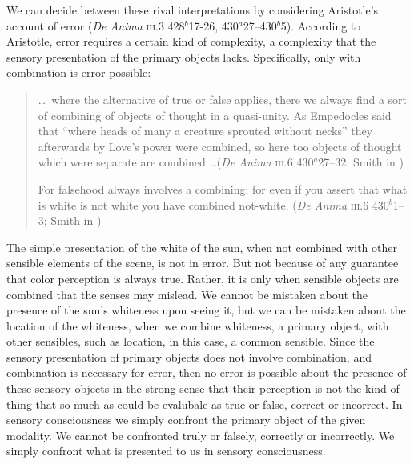 We can decide between these rival interpretations by considering Aristotle's account of error (\emph{De Anima} \textsc{iii}.3 428\( ^{b} \)17-26, 430\( ^{a} \)27--430\( ^{b} \)5). According to Aristotle, error requires a certain kind of complexity, a complexity that the sensory presentation of the primary objects lacks. Specifically, only with combination is error possible:
\begin{quote}
	\ldots\ where the alternative of true or false applies, there we always find a sort of combining of objects of thought in a quasi-unity. As Empedocles said that ``where heads of many a creature sprouted without necks'' they afterwards by Love’s power were combined, so here too objects of thought which were separate are combined \ldots (\emph{De Anima} \textsc{iii}.6 430\( ^{a} \)27--32; Smith in \citealt[54]{Barnes:1984uq})
	
	For falsehood always involves a combining; for even if you assert that what is white is not white you have combined not-white. (\emph{De Anima} \textsc{iii}.6 430\( ^{b} \)1--3; Smith in \citealt[54]{Barnes:1984uq})
\end{quote}
The simple presentation of the white of the sun, when not combined with other sensible elements of the scene, is not in error. But not because of any guarantee that color perception is always true. Rather, it is only when sensible objects are combined that the senses may mislead. We cannot be mistaken about the presence of the sun's whiteness upon seeing it, but we can be mistaken about the location of the whiteness, when we combine whiteness, a primary object, with other sensibles, such as location, in this case, a common sensible. Since the sensory presentation of primary objects does not involve combination, and combination is necessary for error, then no error is possible about the presence of these sensory objects in the strong sense that their perception is not the kind of thing that so much as could be evalubale as true or false, correct or incorrect. In sensory consciousness we simply confront the primary object of the given modality. We cannot be confronted truly or falsely, correctly or incorrectly. We simply confront what is presented to us in sensory consciousness. 

